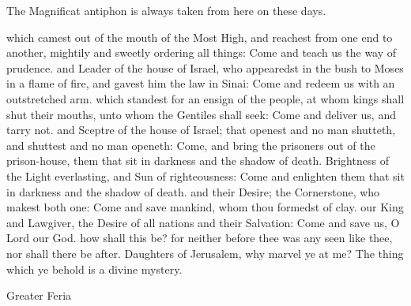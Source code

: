 \begin{rubric}
    The Magnificat antiphon is always taken from here on these days.
\end{rubric}
\begin{multicols}{2}
 {\dag} which camest out of the mouth of the Most High, and reachest from one end to another, mightily and sweetly ordering all things: Come and teach us the way of prudence.
 {\dag} and Leader of the house of Israel, who appearedst in the bush to Moses in a flame of fire, and gavest him the law in Sinai: Come and redeem us with an outstretched arm.
 {\dag} which standest for an ensign of the people, at whom kings shall shut their mouths, unto whom the Gentiles shall seek: Come and deliver us, and tarry not.
 {\dag} and Sceptre of the house of Israel; that openest and no man shutteth, and shuttest and no man openeth: Come, and bring the prisoners out of the prison-house, them that sit in darkness and the shadow of death.
 {\dag} Brightness of the Light everlasting, and Sun of righteousness: Come and enlighten them that sit in darkness and the shadow of death.
 {\dag} and their Desire; the Cornerstone, who makest both one: Come and save mankind, whom thou formedst of clay.
 {\dag} our King and Lawgiver, the Desire of all nations and their Salvation: Come and save us, O Lord our God.
 {\dag} how shall this be? for neither before thee was any seen like thee, nor shall there be after. Daughters of Jerusalem, why marvel ye at me? The thing which ye behold is a divine mystery.
\end{multicols}

\begin{inhead}
{Greater Feria}
\end{inhead}
\par\noindent
{}

